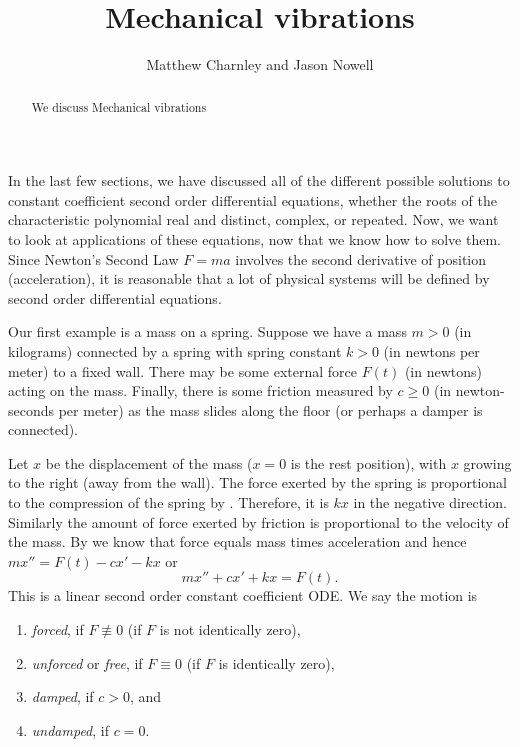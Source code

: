 \documentclass{ximera}
\title{Mechanical vibrations}
\author{Matthew Charnley and Jason Nowell}
\begin{document}
\begin{abstract}
    We discuss Mechanical vibrations
\end{abstract}
\maketitle

\label{sec:mv}



In the last few sections, we have discussed all of the different possible solutions to constant coefficient second order differential equations, whether the roots of the characteristic polynomial real and distinct, complex, or repeated. Now, we want to look at applications of these equations, now that we know how to solve them. Since Newton's Second Law $F = ma$ involves the second derivative of position (acceleration), it is reasonable that a lot of physical systems will be defined by second order differential equations.

\begin{mywrapfigsimp}{2.0in}{2.3in}
    \noindent
    
\end{mywrapfigsimp}
Our first example is a mass on a spring.  Suppose we have a mass $m > 0$ (in kilograms) connected by a spring with spring constant $k > 0$ (in newtons per meter) to a fixed wall.  There may be some external force $F(t)$ (in newtons) acting on the mass.  Finally, there is some friction measured by $c \geq 0$ (in newton-seconds per meter) as the mass slides along the floor (or perhaps a damper is connected).

Let $x$ be the displacement of the mass ($x=0$ is the rest position), with $x$ growing to the right (away from the wall). The force exerted by the spring is proportional to the compression of the spring by . Therefore, it is $kx$ in the negative direction. Similarly the amount of force exerted by friction is proportional to the velocity of the mass. By  we know that force equals mass times acceleration and hence $mx'' = F(t)-cx'-kx$ or
\begin{equation*}
    mx'' + cx' + kx = F(t) .
\end{equation*}
This is a linear second order constant coefficient ODE\@. We say the motion is
\begin{enumerate}
        \item \emph{forced}, if $F \not\equiv 0$ (if $F$ is not identically zero),
        \item \emph{unforced} or \emph{free}, if $F \equiv 0$ (if $F$ is identically zero),
        \item \emph{damped}, if $c > 0$, and
        \item \emph{undamped}, if $c = 0$.
\end{enumerate}
\end{document}
